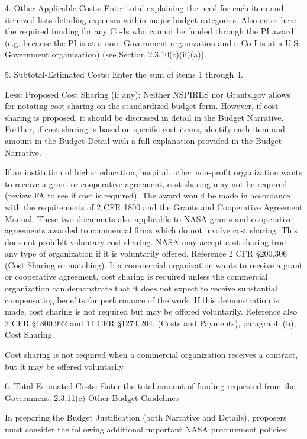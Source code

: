 \documentclass[12pt]{article}
\begin{document}
4. Other Applicable Costs: Enter total explaining the need for each
   item and itemized lists detailing expenses within major budget
   categories. Also enter here the required funding for any Co-Is who
   cannot be funded through the PI award (e.g. because the PI is at a
   non- Government organization and a Co-I is at a U.S. Government
   organization) (see Section 2.3.10(c)(ii)(a)).

5. Subtotal-Estimated Costs: Enter the sum of items 1 through 4.

Less: Proposed Cost Sharing (if any): Neither NSPIRES nor Grants.gov
allows for notating cost sharing on the standardized budget
form. However, if cost sharing is proposed, it should be discussed in
detail in the Budget Narrative. Further, if cost sharing is based on
specific cost items, identify each item and amount in the Budget
Detail with a full explanation provided in the Budget Narrative.

If an institution of higher education, hospital, other non-profit
organization wants to receive a grant or cooperative agreement, cost
sharing may not be required (review FA to see if cost is
required). The award would be made in accordance with the requirements
of 2 CFR 1800 and the Grants and Cooperative Agreement Manual. These
two documents also applicable to NASA grants and cooperative
agreements awarded to commercial firms which do not involve cost
sharing. This does not prohibit voluntary cost sharing. NASA may
accept cost sharing from any type of organization if it is voluntarily
offered. Reference 2 CFR \S200.306 (Cost Sharing or matching). If a
commercial organization wants to receive a grant or cooperative
agreement, cost sharing is required unless the commercial organization
can demonstrate that it does not expect to receive substantial
compensating benefits for performance of the work. If this
demonstration is made, cost sharing is not required but may be offered
voluntarily. Reference also 2 CFR \S1800.922 and 14 CFR \S1274.204,
(Costs and Payments), paragraph (b), Cost Sharing.

Cost sharing is not required when a commercial organization receives a
contract, but it may be offered voluntarily.


6. Total Estimated Costs: Enter the total amount of funding requested
   from the Government. 2.3.11(c) Other Budget Guidelines

In preparing the Budget Justification (both Narrative and Details),
proposers must consider the following additional important NASA
procurement policies:
\end{document}
